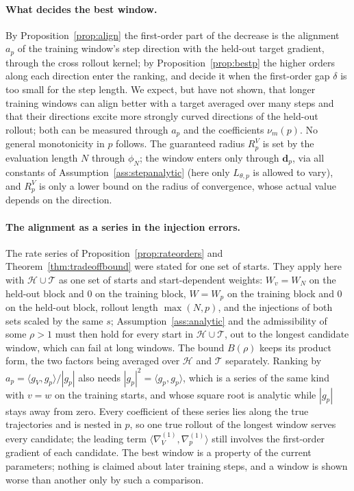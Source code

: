 \documentclass[11pt]{article}
\theoremstyle{definition}
\theoremstyle{remark}
\begin{document}
\paragraph{What decides the best window.}
By Proposition~\ref{prop:align} the first-order part of the decrease is the alignment $a_p$ of the training window's step direction with the held-out target gradient, through the cross rollout kernel; by Proposition~\ref{prop:bestp} the higher orders along each direction enter the ranking, and decide it when the first-order gap $\delta$ is too small for the step length.
We expect, but have not shown, that longer training windows can align better with a target averaged over many steps and that their directions excite more strongly curved directions of the held-out rollout; both can be measured through $a_p$ and the coefficients $\nu_m(p)$.
No general monotonicity in $p$ follows.
The guaranteed radius $R^V_p$ is set by the evaluation length $N$ through $\phi_N$; the window enters only through $\mathbf d_p$, via all constants of Assumption~\ref{ass:stepanalytic} (here only $L_{\theta,p}$ is allowed to vary), and $R^V_p$ is only a lower bound on the radius of convergence, whose actual value depends on the direction.

\paragraph{The alignment as a series in the injection errors.}
The rate series of Proposition~\ref{prop:rateorders} and Theorem~\ref{thm:tradeoffbound} were stated for one set of starts.
They apply here with $\mathcal H\cup\mathcal T$ as one set of starts and start-dependent weights: $W_v=W_N$ on the held-out block and $0$ on the training block, $W=W_p$ on the training block and $0$ on the held-out block, rollout length $\max(N,p)$, and the injections of both sets scaled by the same $s$; Assumption~\ref{ass:analytic} and the admissibility of some $\rho>1$ must then hold for every start in $\mathcal H\cup\mathcal T$, out to the longest candidate window, which can fail at long windows.
The bound $B(\rho)$ keeps its product form, the two factors being averaged over $\mathcal H$ and $\mathcal T$ separately.
Ranking by $a_p=\langle g_V,g_p\rangle/|g_p|$ also needs $|g_p|^2=\langle g_p,g_p\rangle$, which is a series of the same kind with $v=w$ on the training starts, and whose square root is analytic while $|g_p|$ stays away from zero.
Every coefficient of these series lies along the true trajectories and is nested in $p$, so one true rollout of the longest window serves every candidate; the leading term $\langle\nabla^{(1)}_V,\nabla^{(1)}_p\rangle$ still involves the first-order gradient of each candidate.
The best window is a property of the current parameters; nothing is claimed about later training steps, and a window is shown worse than another only by such a comparison.
\end{document}

